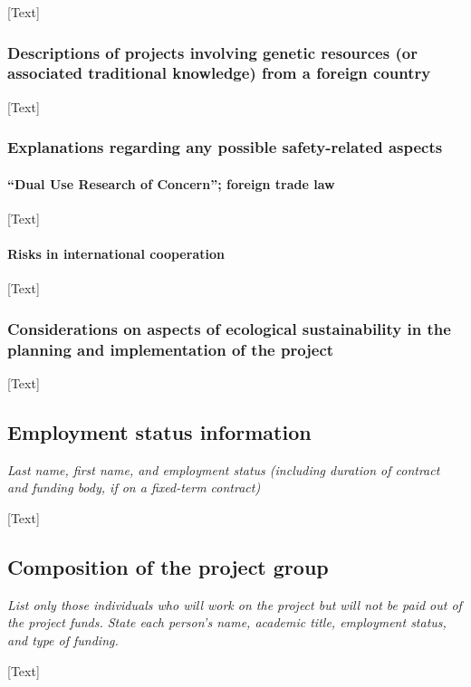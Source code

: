 \documentclass[11pt]{article} %
\begin{document}
[Text]

\subsubsection{Descriptions of projects involving genetic resources (or associated traditional knowledge) from a foreign country }

[Text]

\subsubsection{ Explanations regarding any possible safety-related aspects }

\paragraph{ “Dual Use Research of Concern”; foreign trade law }

[Text]

\paragraph{Risks in international cooperation}

[Text]

\subsubsection{  Considerations on aspects of ecological sustainability in the planning and implementation of the project }

[Text]

\subsection{ Employment status information }
\textit{Last name, first name, and employment status (including duration of contract and funding body, if on a fixed-term contract)}

[Text]


\subsection{ Composition of the project group }
\textit{List only those individuals who will work on the project but will not be paid out of the project funds. State each person’s name, academic title, employment status, and type of funding.}

[Text]
\end{document}
